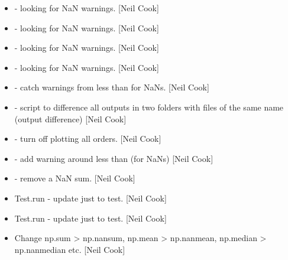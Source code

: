 \documentclass[a4paper,10pt,english]{report}
\begin{document}
\begin{itemize}
\item {} 
 - looking for NaN warnings. {[}Neil Cook{]}

\item {} 
 - looking for NaN warnings. {[}Neil Cook{]}

\item {} 
 - looking for NaN warnings. {[}Neil Cook{]}

\item {} 
 - looking for NaN warnings. {[}Neil Cook{]}

\item {} 
 - catch warnings from less than for NaNs. {[}Neil
Cook{]}

\item {} 
 - script to difference all outputs in two folders
with files of the same name (output difference) {[}Neil Cook{]}

\item {} 
 - turn off plotting all  orders.
{[}Neil Cook{]}

\item {} 
 - add warning around less than (for NaNs) {[}Neil
Cook{]}

\item {} 
 - remove a NaN sum. {[}Neil Cook{]}

\item {} 
Test.run - update just  to test. {[}Neil Cook{]}

\item {} 
Test.run - update just  to test. {[}Neil Cook{]}

\item {} 
Change np.sum \textendash{}\textgreater{} np.nansum, np.mean \textendash{}\textgreater{} np.nanmean, np.median \textendash{}\textgreater{}
np.nanmedian etc. {[}Neil Cook{]}

\end{itemize}
\end{document}
